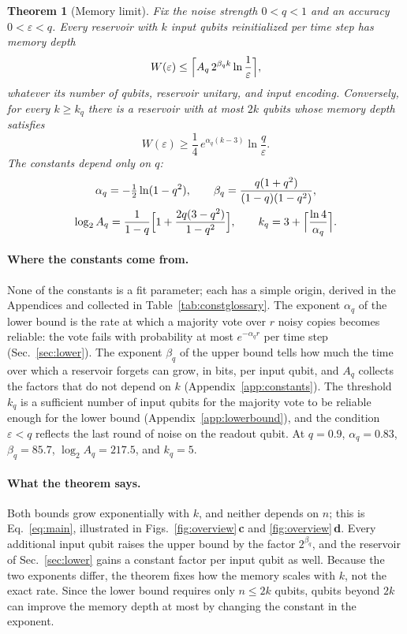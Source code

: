 \documentclass[aps,pra,reprint,superscriptaddress,floatfix]{revtex4-2}
\theoremstyle{plain}
\newtheorem{theorem}{Theorem}
\newcommand{\pnl}[1]{\textsf{\textbf{#1}}}
\begin{document}
\begin{theorem}[Memory limit]\label{thm:main}
Fix the noise strength $0<q<1$ and an accuracy $0<\varepsilon<q$. Every reservoir with $k$ input qubits reinitialized per time step has memory depth
\begin{equation}
W(\varepsilon)\le\Bigl\lceil A_q\,2^{\beta_qk}\ln\frac1\varepsilon\Bigr\rceil,
\label{eq:upper}
\end{equation}
whatever its number of qubits, reservoir unitary, and input encoding. Conversely, for every $k\ge k_q$ there is a reservoir with at most $2k$ qubits whose memory depth satisfies
\begin{equation}
W(\varepsilon)\ge\frac14\,e^{\alpha_q(k-3)}\ln\frac q\varepsilon .
\label{eq:lowerthm}
\end{equation}
The constants depend only on $q$:
\begin{gather}
\alpha_q=-\tfrac12\ln(1-q^2),\qquad\beta_q=\frac{q(1+q^2)}{(1-q)(1-q^2)},\nonumber\\
\log_2A_q=\frac1{1-q}\Bigl[1+\frac{2q(3-q^2)}{1-q^2}\Bigr],\qquad k_q=3+\Bigl\lceil\frac{\ln4}{\alpha_q}\Bigr\rceil.
\label{eq:thmconstants}
\end{gather}
\end{theorem}

\paragraph*{Where the constants come from.}
None of the constants is a fit parameter; each has a simple origin, derived in the Appendices and collected in Table~\ref{tab:constglossary}. The exponent $\alpha_q$ of the lower bound is the rate at which a majority vote over $r$ noisy copies becomes reliable: the vote fails with probability at most $e^{-\alpha_qr}$ per time step (Sec.~\ref{sec:lower}). The exponent $\beta_q$ of the upper bound tells how much the time over which a reservoir forgets can grow, in bits, per input qubit, and $A_q$ collects the factors that do not depend on $k$ (Appendix~\ref{app:constants}). The threshold $k_q$ is a sufficient number of input qubits for the majority vote to be reliable enough for the lower bound (Appendix~\ref{app:lowerbound}), and the condition $\varepsilon<q$ reflects the last round of noise on the readout qubit. At $q=0.9$, $\alpha_q=0.83$, $\beta_q=85.7$, $\log_2A_q=217.5$, and $k_q=5$.

\paragraph*{What the theorem says.}
Both bounds grow exponentially with $k$, and neither depends on $n$; this is Eq.~\eqref{eq:main}, illustrated in Figs.~\ref{fig:overview}\,\pnl{c} and \ref{fig:overview}\,\pnl{d}. Every additional input qubit raises the upper bound by the factor $2^{\beta_q}$, and the reservoir of Sec.~\ref{sec:lower} gains a constant factor per input qubit as well. Because the two exponents differ, the theorem fixes how the memory scales with $k$, not the exact rate. Since the lower bound requires only $n\le2k$ qubits, qubits beyond $2k$ can improve the memory depth at most by changing the constant in the exponent.
\end{document}
